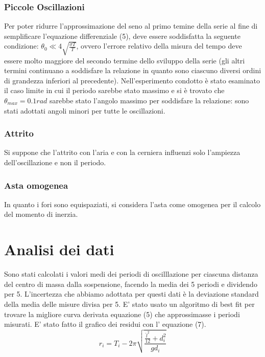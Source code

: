 \documentclass[11pt]{article}
\begin{document}
\subsubsection{Piccole Oscillazioni}
Per poter ridurre l'approssimazione del seno al primo temine della serie al fine di semplificare l'equazione differenziale (5), deve essere soddisfatta la seguente condizione: $\theta_0 \ll 4\sqrt{\frac{\sigma T}{T}}$, ovvero l'errore relativo della misura del tempo deve essere molto maggiore del secondo termine dello sviluppo della serie (gli altri termini continuano a soddisfare la relazione in quanto sono ciascuno diversi ordini di grandezza inferiori al precedente).
Nell'esperimento condotto è stato esaminato il caso limite in cui il periodo sarebbe stato massimo e si è trovato che $\theta_{max}=0.1 rad$  sarebbe stato l'angolo massimo per soddisfare la relazione: sono stati adottati angoli minori per tutte le oscillazioni.
\subsubsection{Attrito}
Si suppone che l'attrito con l'aria e con la cerniera influenzi solo l'ampiezza dell'oscillazione e non il periodo.
\subsubsection{Asta omogenea}
In quanto i fori sono equispaziati, si considera l'asta come omogenea per il calcolo del momento di inerzia.


\section{Analisi dei dati}
Sono stati calcolati i valori medi dei periodi di oscilllazione per ciascuna distanza del centro di massa dalla sospensione, facendo la media dei 5 periodi  e dividendo per 5. L'incertezza che abbiamo adottata per questi dati  è la deviazione standard della media delle misure divisa per 5.
E' stato usato un algoritmo di best fit per trovare la migliore curva derivata equazione (5) che approssimasse i periodi misurati.
E' stato fatto il grafico dei residui con l' equazione (7).
\begin{equation}
  r_i=T_i-2\pi\sqrt{\frac{\frac{\hat{l}^2}{12}+d_i^2}{gd_i}}
\end{equation}
\end{document}
